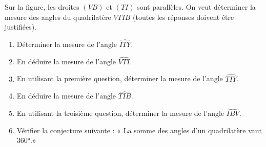 \begin{exercice}   
   Sur la figure,  les droites $(VB)$ et $(TI)$ sont parallèles.
   On veut déterminer la mesure des angles du quadrilatère $VTIB$ (toutes les réponses doivent être justifiées).
   \begin{enumerate}
      \item Déterminer la mesure de l'angle $\widehat{ITY}$.
      \item En déduire la mesure de l'angle $\widehat{VTI}$.
      \item En utilisant la première question, déterminer la mesure de l'angle $\widehat{TIY}$.
      \item En déduire la mesure de l'angle $\widehat{TIB}$.
      \item En utilisant la troisième question, déterminer la mesure de l'angle $\widehat{IBV}$.
      \item Vérifier la conjecture suivante : « La somme des angles d'un quadrilatère vaut 360°.»   
\end{enumerate}
\end{exercice}

